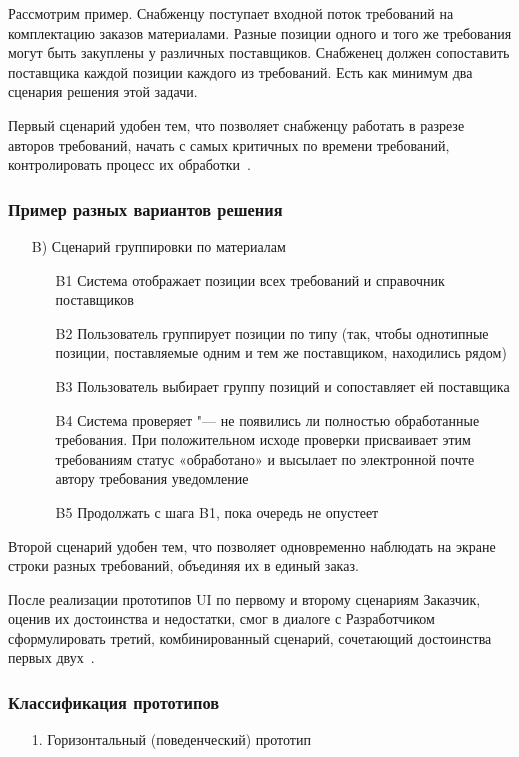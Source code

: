 \documentclass{../industrial-development}
\begin{document}
{\lecturenotes

Рассмотрим пример. Снабженцу поступает входной поток требований на комплектацию заказов материалами. Разные позиции одного и того же требования могут быть закуплены у различных поставщиков. Снабженец должен сопоставить поставщика каждой позиции каждого из требований. Есть как минимум два сценария решения этой задачи.

Первый сценарий удобен тем, что позволяет снабженцу работать в разрезе авторов требований, начать с самых критичных по времени требований, контролировать процесс их обработки~\cite[с.~53]{Maglinec}.

\begin{frame} \frametitle {Пример разных вариантов решения}
\begin{itemize}
\item[B)] Сценарий группировки по материалам
\begin{itemize}
\item[B1] Система отображает позиции всех требований и справочник поставщиков
\item[B2] Пользователь группирует позиции по типу (так, чтобы однотипные позиции, поставляемые одним и тем же поставщиком, находились рядом)
\item[B3] Пользователь выбирает группу позиций и сопоставляет ей поставщика
\item[B4] Система проверяет "--- не появились ли полностью обработанные требования. При положительном исходе проверки присваивает этим требованиям статус «обработано» и высылает по электронной почте автору требования уведомление
\item[B5] Продолжать с шага B1, пока очередь не опустеет
\end{itemize}
\end{itemize}
\end{frame}

\lecturenotes

Второй сценарий удобен тем, что позволяет одновременно наблюдать на экране строки разных требований, объединяя их в единый заказ.

После реализации прототипов UI по первому и второму сценариям Заказчик, оценив их достоинства и недостатки, смог в диалоге с Разработчиком сформулировать третий, комбинированный сценарий, сочетающий достоинства первых двух~\cite[с.~53]{Maglinec}.


\begin{frame} \frametitle {Классификация прототипов}
\begin{itemize}
\item[1.] Горизонтальный (поведенческий) прототип


\end{itemize}
\end{frame}}
\end{document}
